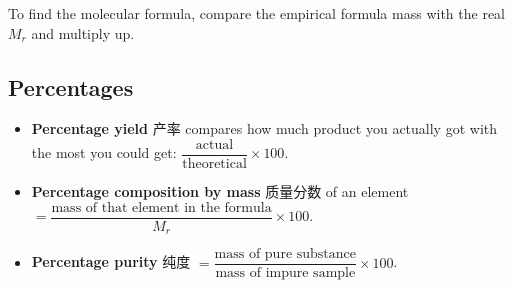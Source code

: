 \documentclass[11pt]{article}
\begin{document}
To find the molecular formula, compare the empirical formula mass with the real $M_r$ and multiply up.

\subsection*{Percentages}

\begin{itemize}
\item \textbf{Percentage yield} 产率 compares how much product you actually got with the most you could get: $\dfrac{\text{actual}}{\text{theoretical}} \times 100$.

\item \textbf{Percentage composition by mass} 质量分数 of an element $= \dfrac{\text{mass of that element in the formula}}{M_r} \times 100$.

\item \textbf{Percentage purity} 纯度 $= \dfrac{\text{mass of pure substance}}{\text{mass of impure sample}} \times 100$.

\end{itemize}
\end{document}
